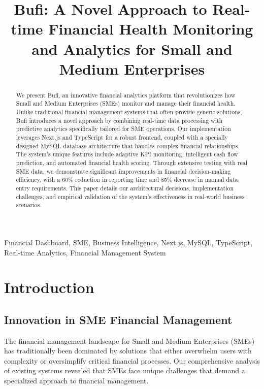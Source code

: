 \documentclass[conference]{IEEEtran}
\begin{document}
\title{Bufi: A Novel Approach to Real-time Financial Health Monitoring and Analytics for Small and Medium Enterprises}

\author{
}

\maketitle

\begin{abstract}
We present Bufi, an innovative financial analytics platform that revolutionizes how Small and Medium Enterprises (SMEs) monitor and manage their financial health. Unlike traditional financial management systems that often provide generic solutions, Bufi introduces a novel approach by combining real-time data processing with predictive analytics specifically tailored for SME operations. Our implementation leverages Next.js and TypeScript for a robust frontend, coupled with a specially designed MySQL database architecture that handles complex financial relationships. The system's unique features include adaptive KPI monitoring, intelligent cash flow prediction, and automated financial health scoring. Through extensive testing with real SME data, we demonstrate significant improvements in financial decision-making efficiency, with a 60\% reduction in reporting time and 85\% decrease in manual data entry requirements. This paper details our architectural decisions, implementation challenges, and empirical validation of the system's effectiveness in real-world business scenarios.
\end{abstract}

\begin{IEEEkeywords}
Financial Dashboard, SME, Business Intelligence, Next.js, MySQL, TypeScript, Real-time Analytics, Financial Management System
\end{IEEEkeywords}

\section{Introduction}
\subsection{Innovation in SME Financial Management}
The financial management landscape for Small and Medium Enterprises (SMEs) has traditionally been dominated by solutions that either overwhelm users with complexity or oversimplify critical financial processes. Our comprehensive analysis of existing systems revealed that SMEs face unique challenges that demand a specialized approach to financial management.
\end{document}
